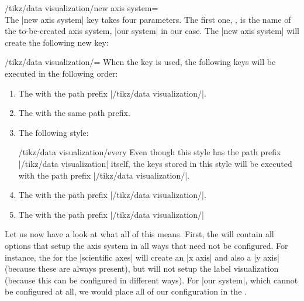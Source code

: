 \begin{key}{/tikz/data visualization/new axis system=\\ %
}
    The |new axis system| key takes four parameters. The first one,
    , is the name of the to-be-created axis system,
    |our system| in our case. The |new axis system| will create the following
    new key:
    \begin{key}{/tikz/data visualization/=}
        When the key  is used, the following keys will be
        executed in the following order:
        \begin{enumerate}
            \item The  with the path prefix
                |/tikz/data visualization/|.
            \item The  with the same path prefix.
            \item The following style:
                \begin{stylekey}{/tikz/data visualization/every }
                    Even though this style has the path prefix
                    |/tikz/data visualization| itself, the keys stored in this
                    style will be executed with the path prefix
                    |/tikz/data visualization/|.
                \end{stylekey}
            \item The  with the path prefix
                |/tikz/data visualization/|.
            \item The  with the path prefix
                |/tikz/data visualization/|
        \end{enumerate}
    \end{key}

    Let us now have a look at what all of this means. First, the  will contain all options that setup the axis system in all ways that
    need not be configured. For instance, the  for the
    |scientific axes| will create an |x axis| and also a |y axis| (because
    these are always present), but will not setup the label visualization
    (because this can be configured in different ways). For |our system|, which
    cannot be configured at all, we would place all of our configuration in the
    .


\end{key}
